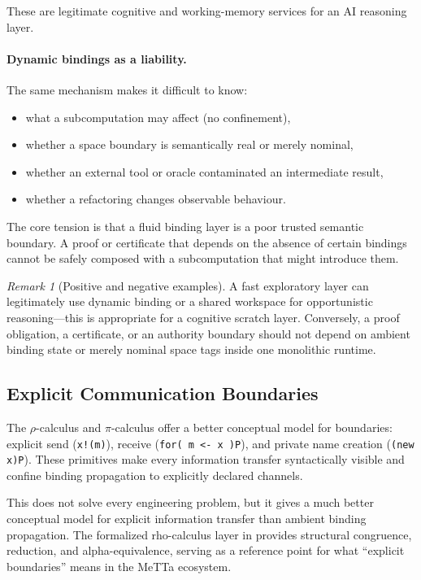 \documentclass[11pt]{article}
\theoremstyle{remark}
\newtheorem{remark}[theorem]{Remark}
\newcommand{\MeTTa}{\textup{MeTTa}}
\newcommand{\code}[1]{\texttt{#1}}
\newcommand{\codepath}[1]{\path{#1}}
\begin{document}
\noindent
These are legitimate cognitive and working-memory services for an AI
reasoning layer.

\paragraph{Dynamic bindings as a liability.}
The same mechanism makes it difficult to know:
\begin{itemize}[nosep]
  \item what a subcomputation may affect (no confinement),
  \item whether a space boundary is semantically real or merely nominal,
  \item whether an external tool or oracle contaminated an intermediate
  result,
  \item whether a refactoring changes observable behaviour.
\end{itemize}

\noindent
The core tension is that a fluid binding layer is a poor trusted semantic
boundary.  A proof or certificate that depends on the absence of certain
bindings cannot be safely composed with a subcomputation that might
introduce them.

\begin{remark}[Positive and negative examples]
A fast exploratory layer can legitimately use dynamic binding or a shared
workspace for opportunistic reasoning---this is appropriate for a cognitive
scratch layer.  Conversely, a proof obligation, a certificate, or an
authority boundary should not depend on ambient binding state or merely
nominal space tags inside one monolithic runtime.
\end{remark}

\subsection{Explicit Communication Boundaries}

The $\rho$-calculus and $\pi$-calculus offer a better conceptual model for
boundaries: explicit send (\code{x!(m)}), receive
(\code{for( m <- x )P}), and private name creation (\code{(new x)P}).
These primitives make every information transfer syntactically visible and
confine binding propagation to explicitly declared channels.

This does not solve every engineering problem, but it gives a much better
conceptual model for explicit information transfer than ambient binding
propagation.  The formalized rho-calculus layer in
\codepath{Mettapedia/Languages/ProcessCalculi/} provides structural
congruence, reduction, and alpha-equivalence, serving as a reference point
for what ``explicit boundaries'' means in the \MeTTa{} ecosystem.
\end{document}

